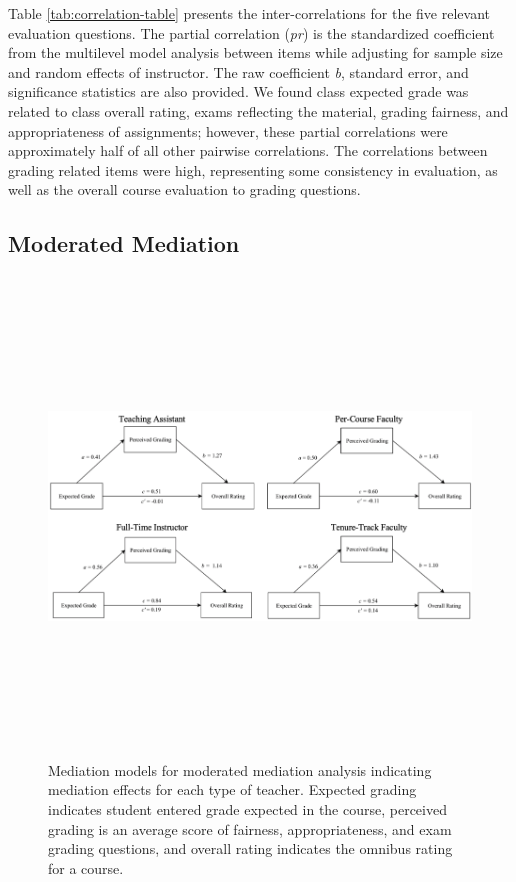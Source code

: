 \documentclass[man]{apa6}
\theoremstyle{definition}
\theoremstyle{definition}
\theoremstyle{definition}
\theoremstyle{remark}
\begin{document}
Table \ref{tab:correlation-table} presents the inter-correlations for
the five relevant evaluation questions. The partial correlation
(\emph{pr}) is the standardized coefficient from the multilevel model
analysis between items while adjusting for sample size and random
effects of instructor. The raw coefficient \emph{b}, standard error, and
significance statistics are also provided. We found class expected grade
was related to class overall rating, exams reflecting the material,
grading fairness, and appropriateness of assignments; however, these
partial correlations were approximately half of all other pairwise
correlations. The correlations between grading related items were high,
representing some consistency in evaluation, as well as the overall
course evaluation to grading questions.

\subsection{Moderated Mediation}\label{moderated-mediation}

\begin{figure}
\includegraphics[width=7in,height=5in]{complete_medmod} \caption{Mediation models for moderated mediation analysis indicating mediation effects for each type of teacher. Expected grading indicates student entered grade expected in the course, perceived grading is an average score of fairness, appropriateness, and exam grading questions, and overall rating indicates the omnibus rating for a course.}\label{fig:med-mod-pic}
\end{figure}
\end{document}
